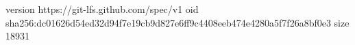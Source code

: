 version https://git-lfs.github.com/spec/v1
oid sha256:dc01626d54ed32d94f7e19cb9d827e6ff9c4408eeb474e4280a5f7f26a8bf0e3
size 18931
